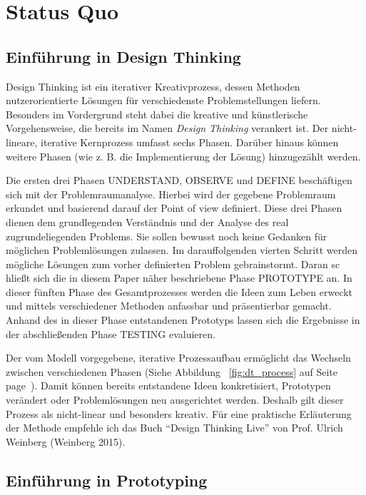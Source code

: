 \section{Status Quo}\label{sec:statusQuo}

\subsection{Einführung in Design Thinking}

Design Thinking ist ein iterativer Kreativprozess, dessen Methoden nutzerorientierte Lösungen für verschiedenste Problemstellungen liefern. Besonders im Vordergrund steht dabei die kreative und künstlerische Vorgehensweise, die bereits im Namen \textit{Design Thinking} verankert ist. Der nicht-lineare, iterative Kernprozess umfasst sechs Phasen. Darüber hinaus können weitere Phasen (wie z. B. die Implementierung der Lösung) hinzugezählt werden.

Die ersten drei Phasen UNDERSTAND, OBSERVE und DEFINE beschäftigen sich mit der Problemraumanalyse. Hierbei wird der gegebene Problemraum erkundet und basierend darauf der Point of view definiert. Diese drei Phasen dienen dem grundlegenden Verständnis und der Analyse des real zugrundeliegenden Problems. Sie sollen bewusst noch keine Gedanken für möglichen Problemlösungen zulassen. Im darauffolgenden vierten Schritt werden mögliche Lösungen zum vorher definierten Problem gebrainstormt. Daran sc  hließt sich die in diesem Paper näher beschriebene Phase PROTOTYPE an. In dieser fünften Phase des Gesamtprozesses werden die Ideen zum Leben erweckt und mittels verschiedener Methoden anfassbar und präsentierbar gemacht. Anhand des in dieser Phase entstandenen Prototyps lassen sich die Ergebnisse in der abschließenden Phase TESTING evaluieren. 


Der vom Modell vorgegebene, iterative Prozessaufbau ermöglicht das Wechseln zwischen verschiedenen Phasen  (Siehe Abbildung ~\ref{fig:dt_process} auf Seite page~\pageref{fig:dt_process}). Damit können bereits entstandene Ideen konkretisiert, Prototypen verändert oder Problemlösungen neu ausgerichtet werden. Deshalb gilt dieser Prozess als nicht-linear und besonders kreativ.
Für eine praktische Erläuterung der Methode empfehle ich das Buch ``Design Thinking Live'' von Prof. Ulrich Weinberg (Weinberg 2015).

\pagebreak
\subsection{Einführung in Prototyping}
\label{intro_prototyping}

